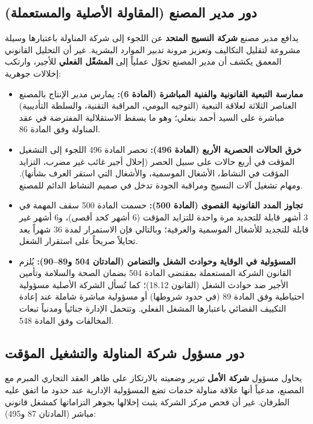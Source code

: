 \subsection{دور مدير المصنع (المقاولة الأصلية والمستعملة)}
يدافع مدير مصنع \textbf{شركة النسيج المتحد} عن اللجوء إلى شركة المناولة باعتبارها وسيلة مشروعة لتقليل التكاليف وتعزيز مرونة تدبير الموارد البشرية. غير أن التحليل القانوني المعمق يكشف أن مدير المصنع تحوّل عملياً إلى \textbf{المشغّل الفعلي} للأجير، وارتكب إخلالات جوهرية:

\begin{itemize}[leftmargin=*, itemsep=5pt]
    \item \textbf{ممارسة التبعية القانونية والفنية المباشرة (المادة \textenglish{6}):} يمارس مدير الإنتاج بالمصنع العناصر الثلاثة لعلاقة التبعية (التوجيه اليومي، المراقبة التقنية، والسلطة التأديبية) مباشرة على السيد أحمد بنعلي؛ وهو ما يسقط الاستقلالية المفترضة في عقد المناولة وفق المادة \textenglish{86}.
    \item \textbf{خرق الحالات الحصرية الأربع (المادة \textenglish{496}):} تحصر المادة \textenglish{496} اللجوء إلى التشغيل المؤقت في أربع حالات على سبيل الحصر (إحلال أجير غائب غير مضرب، التزايد المؤقت في النشاط، الأشغال الموسمية، والأشغال التي استقر العرف بشأنها). ومهام تشغيل آلات النسيج ومراقبة الجودة تدخل في صميم النشاط الدائم للمصنع.
    \item \textbf{تجاوز المدد القانونية القصوى (المادة \textenglish{500}):} حسمت المادة \textenglish{500} سقف المهمة في \textenglish{3} أشهر قابلة للتجديد مرة واحدة للتزايد المؤقت (\textenglish{6} أشهر كحد أقصى)، و\textenglish{6} أشهر غير قابلة للتجديد للأشغال الموسمية والعرفية؛ وبالتالي فإن الاستمرار لمدة \textenglish{36} شهراً يعد تحايلاً صريحاً على استقرار الشغل.
    \item \textbf{المسؤولية في الوقاية وحوادث الشغل والتضامن (المادتان \textenglish{504} و\textenglish{89}--\textenglish{90}):} يُلزم القانون الشركة المستعملة بمقتضى المادة \textenglish{504} بضمان الصحة والسلامة وتأمين الأجير ضد حوادث الشغل (القانون \textenglish{18.12})؛ كما تُسأل الشركة الأصلية مسؤولية احتياطية وفق المادة \textenglish{89} (في حدود شروطها) أو مسؤولية مباشرة شاملة عند إعادة التكييف القضائي باعتبارها المشغل الفعلي. وتتحمل الإدارة جنائياً ومدنياً تبعات المخالفات وفق المادة \textenglish{548}.
\end{itemize}

\subsection{دور مسؤول شركة المناولة والتشغيل المؤقت}
يحاول مسؤول \textbf{شركة الأمل} تبرير وضعيته بالارتكاز على ظاهر العقد التجاري المبرم مع المصنع، مدعياً أنها علاقة مناولة خدمات تضع المسؤولية الإدارية عند حدود ما اتفق عليه الطرفان. غير أن فحص مركز الشركة يثبت إخلالها بجوهر التزاماتها كمشغل قانوني مباشر (المادتان \textenglish{87} و\textenglish{495}):

